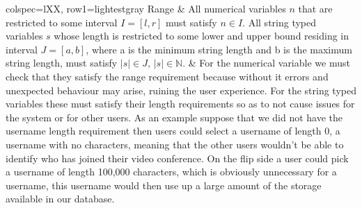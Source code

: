 \begin{longtblr}[
  caption={Data validation rules.}
]{colspec={lXX}, row{1}={lightestgray}}
Range & {All numerical variables $n$ that are restricted to some
interval $I = [l, r]$ must satisfy $n \in I$. All string typed variables $s$
whose length is restricted to some lower and upper bound residing in
interval $J = [a, b]$, where a is the minimum string length and b is
the maximum string length,
must satisfy
$\left|s\right| \in J, \, \left|s\right| \in \mathbb{N} $}. & {For
the numerical variable we must check
that they satisfy the range requirement because without it errors and
unexpected behaviour may arise, ruining the user experience. For the
string typed variables these must satisfy their length requirements so as
to not cause issues for the system or for other users. As an example suppose
that we did not have the username length requirement then users could select
a username of length 0, a username with no characters, meaning that the other
users wouldn't be able to identify who has joined their video conference. On the
flip side a user could pick a username of length 100,000 characters, which is
obviously unnecessary for a username, this username would then use up a large
amount of the storage available in our database.}\\

\end{longtblr}

{\color{gray} \hrulefill}

